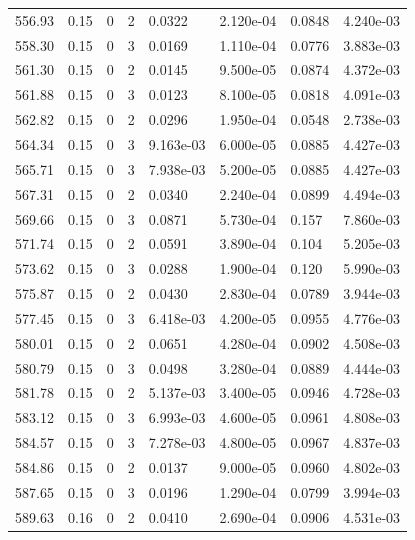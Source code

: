 \documentclass[preview]{standalone}
\begin{document}
{{{{{{{{{\begin{tabular}{L{1.2cm}C{1.2cm} C{0.3cm}C{0.5cm} C{1.4cm}C{1.4cm} C{1.4cm}C{1.4cm}}
  556.93  &  0.15  & 0     &  2 &  0.0322  & 2.120e-04  & 0.0848 &  4.240e-03   \\ 
  558.30  &  0.15  & 0     &  3 &  0.0169  & 1.110e-04  & 0.0776 &  3.883e-03   \\ 
  561.30  &  0.15  & 0     &  2 &  0.0145  & 9.500e-05  & 0.0874 &  4.372e-03   \\ 
  561.88  &  0.15  & 0     &  3 &  0.0123  & 8.100e-05  & 0.0818 &  4.091e-03   \\ 
  562.82  &  0.15  & 0     &  2 &  0.0296  & 1.950e-04  & 0.0548 &  2.738e-03   \\ 
  564.34  &  0.15  & 0     &  3 &  9.163e-03  & 6.000e-05  & 0.0885 &  4.427e-03   \\ 
  565.71  &  0.15  & 0     &  3 &  7.938e-03  & 5.200e-05  & 0.0885 &  4.427e-03   \\ 
  567.31  &  0.15  & 0     &  2 &  0.0340  & 2.240e-04  & 0.0899 &  4.494e-03   \\ 
  569.66  &  0.15  & 0     &  3 &  0.0871  & 5.730e-04  & 0.157 &  7.860e-03   \\ 
  571.74  &  0.15  & 0     &  2 &  0.0591  & 3.890e-04  & 0.104 &  5.205e-03   \\ 
  573.62  &  0.15  & 0     &  3 &  0.0288  & 1.900e-04  & 0.120 &  5.990e-03   \\ 
  575.87  &  0.15  & 0     &  2 &  0.0430  & 2.830e-04  & 0.0789 &  3.944e-03   \\ 
  577.45  &  0.15  & 0     &  3 &  6.418e-03  & 4.200e-05  & 0.0955 &  4.776e-03   \\ 
  580.01  &  0.15  & 0     &  2 &  0.0651  & 4.280e-04  & 0.0902 &  4.508e-03   \\ 
  580.79  &  0.15  & 0     &  3 &  0.0498  & 3.280e-04  & 0.0889 &  4.444e-03   \\ 
  581.78  &  0.15  & 0     &  2 &  5.137e-03  & 3.400e-05  & 0.0946 &  4.728e-03   \\ 
  583.12  &  0.15  & 0     &  3 &  6.993e-03  & 4.600e-05  & 0.0961 &  4.808e-03   \\ 
  584.57  &  0.15  & 0     &  3 &  7.278e-03  & 4.800e-05  & 0.0967 &  4.837e-03   \\ 
  584.86  &  0.15  & 0     &  2 &  0.0137  & 9.000e-05  & 0.0960 &  4.802e-03   \\ 
  587.65  &  0.15  & 0     &  3 &  0.0196  & 1.290e-04  & 0.0799 &  3.994e-03   \\ 
  589.63  &  0.16  & 0     &  2 &  0.0410  & 2.690e-04  & 0.0906 &  4.531e-03   \\ 

\end{tabular}}}}}}}}}}
\end{document}
